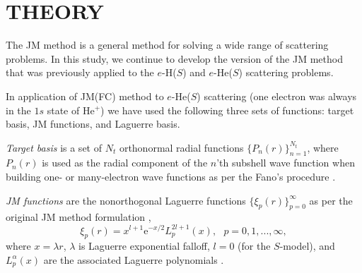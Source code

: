 \documentclass[aip
, pra
, showpacs
, aps
, twocolumn
, groupedaddress
, floatfix
]{revtex4}
\newcommand{\beq}{\begin{equation}}
\newcommand{\eeq}{\end{equation}}
\begin{document}
\begin{table}[htb]
\begin{ruledtabular}
\begin{tabular}{rlll}




\end{tabular}
\end{ruledtabular}
\end{table}



\section{THEORY}

The JM method \cite{JMatrix2008,HY74p1201,BR76p1491} is a general method for solving a wide range of scattering problems.
In this study, we continue to develop the version of the JM method that
was previously applied to the $e$-H($S$) \cite{KB10p022708}  and $e$-He($S$) \cite{KFB11} scattering problems.


In application of JM(FC) method to $e$-He($S$) \cite{KFB11} scattering (one electron was always in the $1s$ state of He$^+$) we have used
the following three sets of functions: target basis, JM functions, and Laguerre basis.


{\em Target basis} is a set of $N_t$ orthonormal radial functions $\{P_n(r)\}_{n=1}^{N_t}$,
where $P_n(r)$ is used as the radial component of the $n$'th subshell wave function
when building one- or many-electron wave functions as per the Fano's procedure \cite{Fano65, KFB11}.


{\em JM functions} are the nonorthogonal Laguerre functions $\{\xi_p(r)\}_{p=0}^\infty$ as per the original JM method 
formulation \cite{HY74p1201,BR76p1491},
\beq
\xi_p(r) = x^{l+1} \mbox{e}^{-x /2}
L_p^{2l+1}(x), \ \ \ p = 0, 1, ..., \infty,
\eeq
where $x=\lambda r$, $\lambda$ is Laguerre exponential falloff,
$l = 0$ (for the $S$-model), and $L_p^{\alpha}(x)$ are the associated Laguerre polynomials \cite{abramowitz}.
\end{document}
